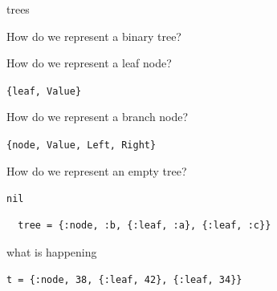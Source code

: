 \begin{frame}[fragile]{trees}

\pause How do we represent a binary tree?


\vspace{10pt}
\pause How do we represent a leaf node?

\vspace{10pt}
{\tt \{leaf, Value\}}

\vspace{20pt}
\pause How do we represent a branch node?

\vspace{10pt}
{\tt \{node, Value, Left, Right\}}

\vspace{10pt}
\pause How do we represent an empty tree?

\vspace{10pt}
{\tt nil}


\vspace{10pt}

\begin{verbatim}
  tree = {:node, :b, {:leaf, :a}, {:leaf, :c}}
\end{verbatim}


\end{frame}


\begin{frame}{what is happening}

{\tt t = \{:node, 38, \{:leaf, 42\}, \{:leaf, 34\}\}}

\pause \vspace{20pt}


\end{frame}

